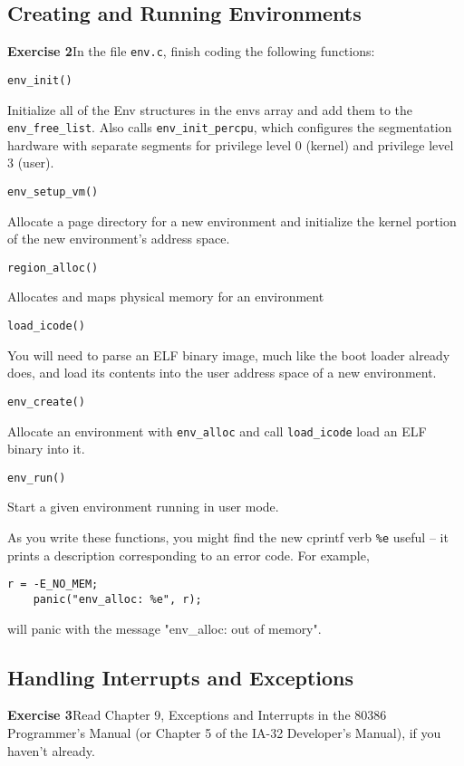 \documentclass[11pt]{article}
\begin{document}
\subsection{Creating and Running Environments}
\begin{framed}
\noindent\textbf{Exercise 2}In the file \lstinline|env.c|, finish coding the following functions:


\noindent\lstinline|env_init()|

    Initialize all of the Env structures in the envs array and add them to the \lstinline|env_free_list|. Also calls \lstinline|env_init_percpu|, which configures the segmentation hardware with separate segments for privilege level 0 (kernel) and privilege level 3 (user).

\noindent\lstinline|env_setup_vm()|

    Allocate a page directory for a new environment and initialize the kernel portion of the new environment's address space.

\noindent\lstinline|region_alloc()|

    Allocates and maps physical memory for an environment

\noindent\lstinline|load_icode()|

    You will need to parse an ELF binary image, much like the boot loader already does, and load its contents into the user address space of a new environment.

\noindent\lstinline|env_create()|

    Allocate an environment with \lstinline|env_alloc| and call \lstinline|load_icode| load an ELF binary into it.
    
\noindent\lstinline|env_run()|

    Start a given environment running in user mode.

As you write these functions, you might find the new cprintf verb \lstinline|%e| useful -- it prints a description corresponding to an error code. For example,

\begin{lstlisting}[aboveskip=-1.5em,frame=none]
	r = -E_NO_MEM;
	panic("env_alloc: %e", r);
\end{lstlisting}

will panic with the message "env\_alloc: out of memory". 
\end{framed}

\subsection{Handling Interrupts and Exceptions}
\begin{framed}
\noindent\textbf{Exercise 3}Read Chapter 9, Exceptions and Interrupts in the 80386 Programmer's Manual (or Chapter 5 of the IA-32 Developer's Manual), if you haven't already. 
\end{framed}
\end{document}
